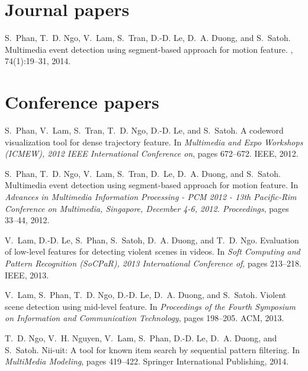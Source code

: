 
\begin{thebibliography}{10}

\section*{Journal papers}

S.~Phan, T.~D. Ngo, V.~Lam, S.~Tran, D.-D. Le, D.~A. Duong, and S.~Satoh.
\newblock Multimedia event detection using segment-based approach for motion
  feature.
, 74(1):19--31, 2014.

\section*{Conference papers}

S.~Phan, V.~Lam, S.~Tran, T.~D. Ngo, D.-D. Le, and S.~Satoh.
\newblock A codeword visualization tool for dense trajectory feature.
\newblock In {\em Multimedia and Expo Workshops (ICMEW), 2012 IEEE
  International Conference on}, pages 672--672. IEEE, 2012.
  
S.~Phan, T.~D. Ngo, V.~Lam, S.~Tran, D.~Le, D.~A. Duong, and S.~Satoh.
\newblock Multimedia event detection using segment-based approach for motion
  feature.
\newblock In {\em Advances in Multimedia Information Processing - {PCM} 2012 -
  13th Pacific-Rim Conference on Multimedia, Singapore, December 4-6, 2012.
  Proceedings}, pages 33--44, 2012.
  
V.~Lam, D.-D. Le, S.~Phan, S.~Satoh, D.~A. Duong, and T.~D. Ngo.
\newblock Evaluation of low-level features for detecting violent scenes in
  videos.
\newblock In {\em Soft Computing and Pattern Recognition (SoCPaR), 2013
  International Conference of}, pages 213--218. IEEE, 2013.

V.~Lam, S.~Phan, T.~D. Ngo, D.-D. Le, D.~A. Duong, and S.~Satoh.
\newblock Violent scene detection using mid-level feature.
\newblock In {\em Proceedings of the Fourth Symposium on Information and
  Communication Technology}, pages 198--205. ACM, 2013.
  
T.~D. Ngo, V.~H. Nguyen, V.~Lam, S.~Phan, D.-D. Le, D.~A. Duong, and S.~Satoh.
\newblock Nii-uit: A tool for known item search by sequential pattern
  filtering.
\newblock In {\em MultiMedia Modeling}, pages 419--422. Springer International
  Publishing, 2014.


\end{thebibliography}
